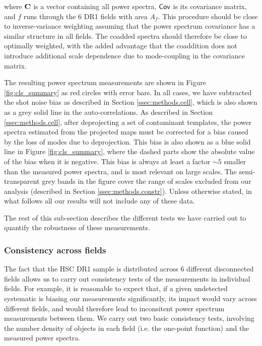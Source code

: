 \documentclass[a4paper,11pt]{article}
\begin{document}
      where ${\bf C}$ is a vector containing all power spectra, ${\sf Cov}$ is its covariance matrix, and $f$ runs through the 6 DR1 fields with area $A_f$. This procedure should be close to inverse-variance weighting assuming that the power spectrum covariance has a similar structure in all fields. The coadded spectra should therefore be close to optimally weighted, with the added advantage that the coaddition does not introduce additional scale dependence due to mode-coupling in the covariance matrix.
      
      The resulting power spectrum measurements are shown in Figure \ref{fig:cls_summary} as red circles with error bars. In all cases, we have subtracted the shot noise bias as described in Section \ref{ssec:methods.cell}, which is also shown as a grey solid line in the auto-correlations. As described in Section \ref{ssec:methods.cell}, after deprojecting a set of contaminant templates, the power spectra estimated from the projected maps must be corrected for a bias caused by the loss of modes due to deprojection. This bias is also shown as a blue solid line in Figure \ref{fig:cls_summary}, where the dashed parts show the absolute value of the bias when it is negative. This bias is always at least a factor $\sim5$ smaller than the measured power spectra, and is most relevant on large scales. The semi-transparent grey bands in the figure cover the range of scales excluded from our analysis (described in Section \ref{ssec:methods.constr}). Unless otherwise stated, in what follows all our results will not include any of these data.
      
      The rest of this sub-section describes the different tests we have carried out to quantify the robustness of these measurements.

    \subsubsection{Consistency across fields}\label{sssec:results.spectra.consistent}
      The fact that the HSC DR1 sample is distributed across 6 different disconnected fields allows us to carry out consistency tests of the measurements in individual fields. For example, it is reasonable to expect that, if a given undetected systematic is biasing our measurements significantly, its impact would vary across different fields, and would therefore lead to inconsitent power spectrum measurements between them. We carry out two basic consistency tests, involving the number density of objects in each field (i.e. the one-point function) and the measured power spectra.
      
\end{document}

